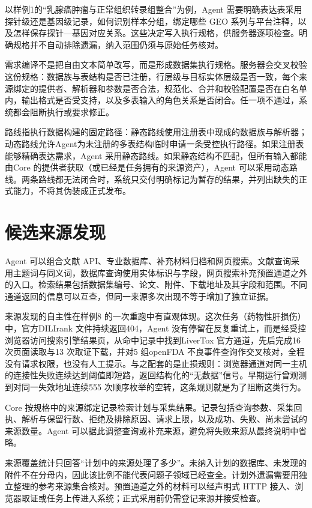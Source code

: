 以样例1的“乳腺癌肿瘤与正常组织转录组整合”为例，Agent 需要明确表达表采用探针级还是基因级记录，如何识别样本分组，绑定哪些 GEO 系列与平台注释，以及怎样保存探针—基因对应关系。这些决定写入执行规格，供服务器逐项检查。明确规格并不自动排除遗漏，纳入范围仍须与原始任务核对。

需求编译不是把自由文本简单改写，而是形成数据集执行规格。服务器会交叉校验这份规格：数据族与表结构是否已注册，行层级与目标实体层级是否一致，每个来源绑定的提供者、解析器和参数是否合法，规范化、合并和校验配置是否在白名单内，输出格式是否受支持，以及多表输入的角色关系是否闭合。任一项不通过，系统都会阻断执行或要求修正。

路线指执行数据构建的固定路径：静态路线使用注册表中现成的数据族与解析器；动态路线允许Agent为未注册的多表结构临时申请一条受控执行路径。如果注册表能够精确表达需求，Agent 采用静态路线。如果静态结构不匹配，但所有输入都能由Core 的提供者获取（或已经是任务拥有的来源资产），Agent 可以采用动态路线。两条路线都无法闭合时，系统只交付明确标记为暂存的结果，并列出缺失的正式能力，不将其伪装成正式发布。

\section{候选来源发现}\label{sec:source-discovery}

Agent 可以组合文献 API、专业数据库、补充材料归档和网页搜索。文献查询采用主题词与同义词，数据库查询使用实体标识与字段，网页搜索补充预置通道之外的入口。检索结果包括数据集编号、论文、附件、下载地址及其字段和范围。不同通道返回的信息可以互查，但同一来源多次出现不等于增加了独立证据。

来源发现的自主性在样例8 的一次重跑中有直观体现。这次任务（药物性肝损伤）中，官方DILIrank 文件持续返回404，Agent 没有停留在反复重试上，而是经受控浏览器访问搜索引擎结果页，从命中记录中找到LiverTox 官方通道，先后完成16 次页面读取与13 次取证下载，并对5 组openFDA 不良事件查询作交叉核对，全程没有请求权限，也没有人工提示。与之配套的是止损规则：浏览器通道对同一主机的连接性失败连续达到阈值即短路，返回结构化的“无数据”信号。早期运行曾观测到对同一失效地址连续555 次顺序枚举的空转，这条规则就是为了阻断这类行为。

Core 按规格中的来源绑定记录检索计划与采集结果。记录包括查询参数、采集回执、解析与保留行数、拒绝及排除原因、请求上限，以及成功、失败、尚未尝试的来源数量。Agent 可以据此调整查询或补充来源，避免将失败来源从最终说明中省略。

来源覆盖统计只回答“计划中的来源处理了多少”。未纳入计划的数据库、未发现的附件不在分母内，因此该比例不能代表问题子领域已经查全。计划外遗漏需要用独立整理的参考来源集合核对。预置通道之外的材料可以经声明式 HTTP 接入、浏览器取证或任务上传进入系统；正式采用前仍需登记来源并接受检查。

